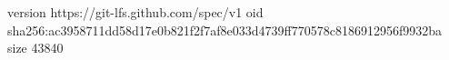 version https://git-lfs.github.com/spec/v1
oid sha256:ac3958711dd58d17e0b821f2f7af8e033d4739ff770578c8186912956f9932ba
size 43840
